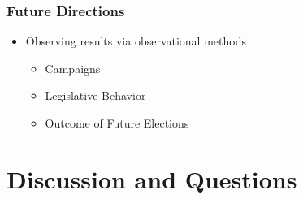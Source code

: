 \documentclass[14pt]{beamer}
\begin{document}
\begin{frame}
\frametitle{Future Directions}
\begin{itemize}
	\item Observing results via observational methods 
	\begin{itemize}
		\item Campaigns
		\item Legislative Behavior
		\item Outcome of Future Elections
	\end{itemize}
\end{itemize}
\end{frame}


\section{Discussion and Questions}
\end{document}
